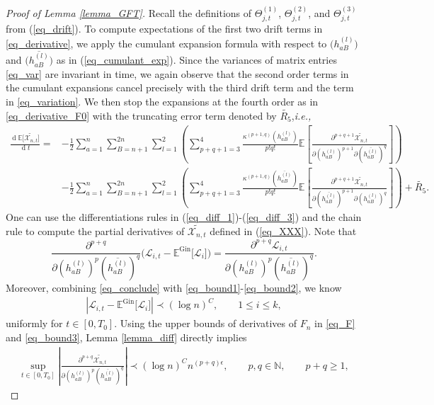\documentclass[10pt,reqno]{amsart}
\numberwithin{equation}{section}
\numberwithin{figure}{section}
\theoremstyle{plain}
\newcommand{\N}{{\mathbb{N}}}
\newcommand{\wt}{\widetilde}
\newcommand{\<}{\langle}
\renewcommand{\>}{\rangle}
\newcommand{\E}{\mathbb{E}}
\newcommand{\dd}{\operatorname{d}\!{}}
\newcommand{\ie}{\emph{i.e., }}
\begin{document}
\begin{proof}[Proof of Lemma \ref{lemma_GFT}]
	
	Recall the definitions of $\Theta^{(1)}_{j,t}$, $\Theta^{(2)}_{j,t}$, and $\Theta^{(3)}_{j,t}$ from (\ref{eq_drift}). To compute expectations of the first two drift terms in \eqref{eq_derivative}, we apply the cumulant expansion formula  with respect to $\big(h^{(l)}_{aB}\big)$ and $\big(\overline{h^{(l)}_{aB}}\big)$ as in (\ref{eq_cumulant_exp}). Since the variances of matrix entries \eqref{eq_var} are invariant in time,  we  again observe that the second order terms in the cumulant expansions cancel precisely with the third drift term and the term in \eqref{eq_variation}.  We then stop the expansions at the fourth order as in \eqref{eq_derivative_F0} with the truncating error term denoted by $\wt{R_5}$,\ie
	\begin{align}\label{eq_cumulant_exp_FF}
		\frac{\dd \mathbb{E}\big[ \wt{\mathcal{X}_{n,t}}\big]}{\dd t}
		=&-\frac{1}{2} \sum_{a=1}^n \sum_{B=n+1}^{2n}
		\sum_{l=1}^2 \left( \sum_{p+q+1= 3}^{4}\frac{\kappa^{(p+1,q)}(h^{(l)}_{aB})}{p!q!}
		\mathbb{E} \left[   \frac{\partial^{p+q+1} \wt{\mathcal{X}_{n,t}}}{\partial (h^{(l)}_{aB})^{p+1} \partial (\overline{h^{(l)}_{aB}})^{q} } \right] \right)\nonumber\\
		&-\frac{1}{2} \sum_{a=1}^n \sum_{B=n+1}^{2n} \sum_{l=1}^2 \left(\sum_{p+q+1 = 3}^{4}\frac{\kappa^{(p+1,q)}(\overline{h^{(l)}_{aB}})}{p!q!}
		\mathbb{E} \left[   \frac{\partial^{p+q+1}\wt{\mathcal{X}_{n,t}} }{\partial (\overline{h^{(l)}_{aB}})^{p+1} \partial (h^{(l)}_{aB})^{q}}\right]\right)+\wt{R_5}.
	\end{align}
  One can use the differentiations rules in (\ref{eq_diff_1})-(\ref{eq_diff_3}) and the chain rule to compute the partial derivatives of $\wt{\mathcal{X}_{n,t}}$ defined in (\ref{eq_XXX}). Note that $$\frac{\partial^{p+q} }{\partial (h^{(l)}_{aB})^{p} (\overline{h^{(l)}_{aB}})^{q}}\Big(\mathcal{L}_{i,t}-\E^{\mathrm{Gin}}\big[\mathcal{L}_{i}\big] \Big) =\frac{\partial^{p+q} \mathcal{L}_{i,t}}{\partial (h^{(l)}_{aB})^{p} (\overline{h^{(l)}_{aB}})^{q}}.$$ 
Moreover, combining \eqref{eq_conclude} with \eqref{eq_bound1}-\eqref{eq_bound2}, we know
    \begin{align}\label{eq_bound3}
    \left| \mathcal{L}_{i,t}-\E^{\mathrm{Gin}}\big[\mathcal{L}_{i}\big] \right| \prec (\log n)^C, \qquad 1\leq i\leq k,
    \end{align}
    uniformly for $t\in [0,T_0]$.
Using the upper bounds of derivatives of $F_n$ in \eqref{eq_F} and \eqref{eq_bound3}, Lemma \ref{lemma_diff} directly implies
	\begin{align}\label{eq_bound_F}
		\sup_{t \in[0,T_0]} \left|  \frac{\partial^{p+q} \wt{\mathcal{X}_{n,t}} }{\partial (h^{(l)}_{aB})^{p} (\overline{h^{(l)}_{aB}})^{q}} \right| \prec (\log n)^{C} n^{(p+q)\epsilon}, \qquad p,q \in \N, \qquad p+q\geq 1,

\end{align}
\end{proof}
\end{document}
